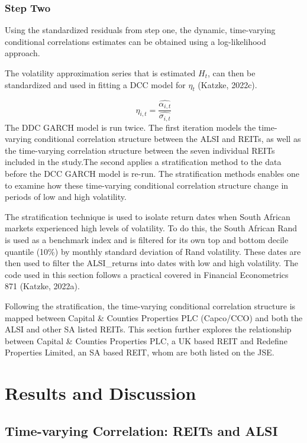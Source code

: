 \documentclass[11pt,preprint, authoryear]{elsarticle}
\numberwithin{equation}{section}
\numberwithin{figure}{section}
\numberwithin{table}{section}
\begin{document}
\hypertarget{step-two}{%
\subsubsection{Step Two}\label{step-two}}

Using the standardized residuals from step one, the dynamic,
time-varying conditional correlations estimates can be obtained using a
log-likelihood approach.

The volatility approximation series that is estimated \(H_{t}\), can
then be standardized and used in fitting a DCC model for \(\eta_{t}\)
(Katzke, 2022c).

\[
\eta_{i, t}=\frac{\hat{\alpha_{i, t}}}{\hat{\sigma_{i, t}}}
\] The DDC GARCH model is run twice. The first iteration models the
time-varying conditional correlation structure between the ALSI and
REITs, as well as the time-varying correlation structure between the
seven individual REITs included in the study.The second applies a
stratification method to the data before the DCC GARCH model is re-run.
The stratification methods enables one to examine how these time-varying
conditional correlation structure change in periods of low and high
volatility.

The stratification technique is used to isolate return dates when South
African markets experienced high levels of volatility. To do this, the
South African Rand is used as a benchmark index and is filtered for its
own top and bottom decile quantile (10\%) by monthly standard deviation
of Rand volatility. These dates are then used to filter the
ALSI\_returns into dates with low and high volatility. The code used in
this section follows a practical covered in Financial Econometrics 871
(Katzke, 2022a).

Following the stratification, the time-varying conditional correlation
structure is mapped between Capital \& Counties Properties PLC
(Capco/CCO) and both the ALSI and other SA listed REITs. This section
further explores the relationship between Capital \& Counties Properties
PLC, a UK based REIT and Redefine Properties Limited, an SA based REIT,
whom are both listed on the JSE.

\hypertarget{results-and-discussion}{%
\section{\texorpdfstring{Results and Discussion
\label{Results}}{Results and Discussion }}\label{results-and-discussion}}

\hypertarget{time-varying-correlation-reits-and-alsi}{%
\subsection{Time-varying Correlation: REITs and
ALSI}\label{time-varying-correlation-reits-and-alsi}}
\end{document}
